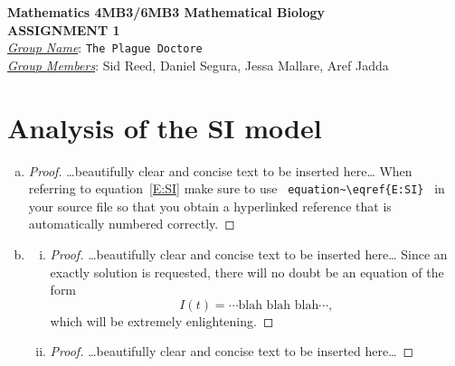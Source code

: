 \documentclass[12pt]{article}
\begin{document}
\begin{center}
{\bfseries Mathematics 4MB3/6MB3 Mathematical Biology\\
 ASSIGNMENT {\color{blue}1}}\\
\medskip
\underline{\emph{Group Name}}: \texttt{{\color{blue}The Plague Doctore}}\\
\medskip
\underline{\emph{Group Members}}: {\color{blue}Sid Reed, Daniel Segura, Jessa Mallare, Aref Jadda}
\end{center}
\section{Analysis of the SI model}

\SIanalIntro
\begin{enumerate}[(a)]
\item \SIanalQa

  {\color{blue}
    \begin{proof}
      {\color{magenta}\dots beautifully clear and concise text to be inserted here\dots}
      When referring to equation~\eqref{E:SI} make sure to use ~\verb|equation~\eqref{E:SI}|~ in your source file so that you obtain a hyperlinked reference that is automatically numbered correctly.
    \end{proof}
  }

\item \SIanalQb
  \begin{enumerate}[(i)]
  \item \SIanalQbi

    {\color{blue}
      \begin{proof}
        {\color{magenta}\dots beautifully clear and concise text to be inserted here\dots}
        Since an exactly solution is requested, there will no doubt be an equation of the form
        \begin{equation}
          I(t) = \cdots \text{blah blah blah} \cdots ,
        \end{equation}
        which will be extremely enlightening.
      \end{proof}
    }

  \item \SIanalQbii

    {\color{blue}
      \begin{proof}
        {\color{magenta}\dots beautifully clear and concise text to be inserted here\dots}
      \end{proof}
    }

  \end{enumerate}
\end{enumerate}
\end{document}
